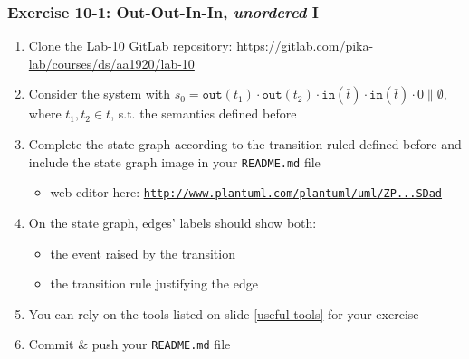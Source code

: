 \documentclass[presentation]{beamer}\mode<presentation>{\usetheme{AMSCesenaPurpleAndGold}}
\begin{document}
\begin{frame}
\frametitle{Exercise 10-1: Out-Out-In-In, \emph{unordered} I}
    \begin{enumerate}
        \item Clone the Lab-10 GitLab repository: \url{https://gitlab.com/pika-lab/courses/ds/aa1920/lab-10}
        
        \vfill
        
        \item Consider the system with \alert{$s_0 = \mathtt{out}(t_1) \cdot \mathtt{out}(t_2) \cdot \mathtt{in}(\bar t) \cdot \mathtt{in}(\bar t) \cdot 0  \parallel \emptyset$}, where $t_1, t_2 \in \bar{t}$, s.t. the \linda{} semantics defined before
        
        \vfill
    
        \item Complete the state graph according to the transition ruled defined before and include the state graph image in your \alert{\texttt{README.md}} file
        \begin{itemize}
            \item web editor here: \href{
                http://www.plantuml.com/plantuml/uml/ZPBVJl8m6CRFUnNl8Nm9P8m_4488-H0JJp0HE48E6bQneMkNjLFHUE22YGVSXWToBIRU0rTYHvakSpWFbhNls-VtF6_JdbJOLu7Ba5nIxc4Vkt12hd30rAdWQaJl2TXMeZbIM95zIwqO0QemetEPhHvYbq1V13ubFhgc3W7YUce53f5pdtgA2euIIXcXuG41_CVpvS8N0NVwWWc_qnbmX_95jmk2qHkITMB2oPsdLyJHfrQ4CN6B7X6Q_fj1gTG5QI63brORHA0AQXS-5Sk7LLWiKrvGx-lllmMxbrVzFIDf6K8b8Rpaq_F9MAzco71DEu-sUOlKkyqMoOg1sctuM6lQsN0qk1ZFlkhL12t3p8PyjyWAITlmQl0xiAhxUQ7rTdlOXliPgWTsQeQuNa_LZPV9SZpo3vUQeJMCoDo-PkxZnytc4QlwNyUAt92iPzFYUYkE42OYn5ODI3t2Ti8ZqzoCPzJDj3hlYapYMDxADZSUnrzXZt0dSDad
            }{\texttt{http://www.plantuml.com/plantuml/uml/ZP...SDad}}
        \end{itemize}
        
        \vfill
        
        \item On the state graph, edges' labels should show both:
        \begin{itemize}
            \item the event raised by the transition
            \item the transition rule justifying the edge
        \end{itemize}
        
        \vfill
        
        \item You can rely on the tools listed on slide \ref{useful-tools} for your exercise
        
        \vfill
        
        \item Commit \& push your \texttt{README.md} file
        
    \end{enumerate}
    
\end{frame}
\end{document}
